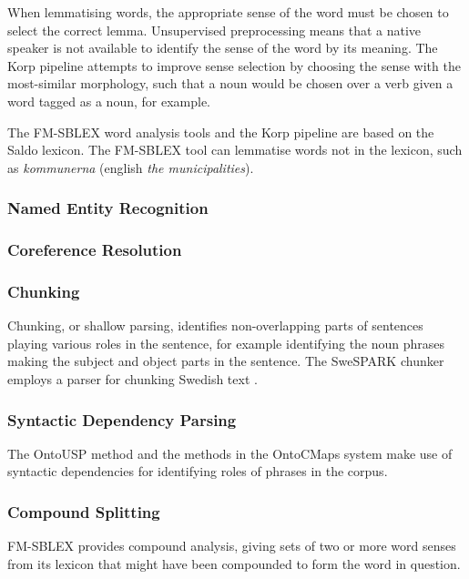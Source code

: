 \documentclass[a4paper]{report}
\begin{document}
When lemmatising words, the appropriate sense of the word must be chosen to select the correct lemma.
Unsupervised preprocessing means that a native speaker is not available to identify the sense of the word by its meaning.
The Korp pipeline attempts to improve sense selection by choosing the sense with the most-similar morphology, such that a noun would be chosen over a verb given a word tagged as a noun, for example.

The FM-SBLEX word analysis tools and the Korp pipeline are based on the Saldo lexicon.
The FM-SBLEX tool can lemmatise words not in the lexicon, such as \emph{kommunerna} (english \emph{the municipalities}).


\subsubsection{Named Entity Recognition}

\subsubsection{Coreference Resolution}

\subsubsection{Chunking}

Chunking, or shallow parsing, identifies non-overlapping parts of sentences playing various roles in the sentence, for example identifying the noun phrases making the subject and object parts in the sentence.
The SweSPARK chunker employs a parser for chunking Swedish text \cite{Megyesi02Thesis}.

\subsubsection{Syntactic Dependency Parsing}

The OntoUSP \citep{Poon2010OntoUSP} method and the methods in the OntoCMaps system \citep{Zouaq11OntoCmaps} make use of syntactic dependencies for identifying roles of phrases in the corpus.

\subsubsection{Compound Splitting}

FM-SBLEX provides compound analysis, giving sets of two or more word senses from its lexicon that might have been compounded to form the word in question.
\end{document}
